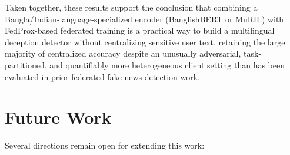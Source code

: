 Taken together, these results support the conclusion that combining a Bangla/Indian-language-specialized encoder (BanglishBERT or MuRIL) with FedProx-based federated training is a practical way to build a multilingual deception detector without centralizing sensitive user text, retaining the large majority of centralized accuracy despite an unusually adversarial, task-partitioned, and quantifiably more heterogeneous client setting than has been evaluated in prior federated fake-news detection work.

\section{Future Work}
\label{sec:future-work}

Several directions remain open for extending this work:

